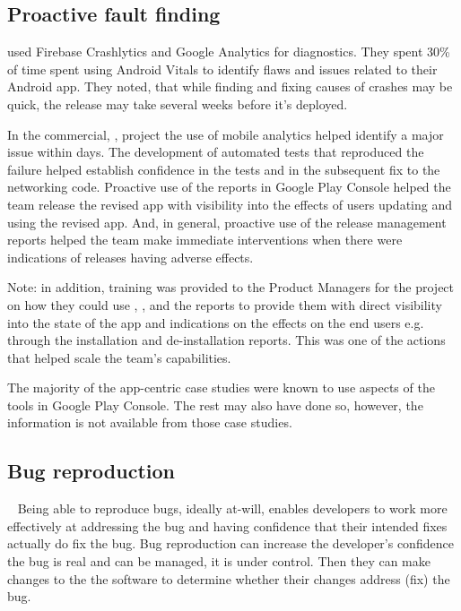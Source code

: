 \subsection{Proactive fault finding}
 used Firebase Crashlytics and Google Analytics for diagnostics. They spent 30\% of time spent using Android Vitals to identify flaws and issues related to their Android app. %
They noted, that while finding and fixing causes of crashes may be quick, the release may take several weeks before it's deployed.

In the commercial, , project the use of mobile analytics helped identify a major issue within days. The development of automated tests that reproduced the failure helped establish confidence in the tests and in the subsequent fix to the networking code. Proactive use of the  reports in Google Play Console helped the team release the revised app with visibility into the effects of users updating and using the revised app. And, in general, proactive use of the release management reports helped the team make immediate interventions when there were indications of releases having adverse effects.

Note: in addition, training was provided to the Product Managers for the project on how they could use , , and the  reports to provide them with direct visibility into the state of the app and indications on the effects on the end users e.g. through the installation and de-installation reports. This was one of the actions that helped scale the team's capabilities.

The majority of the app-centric case studies were known to use aspects of the  tools in Google Play Console. The rest may also have done so, however, the information is not available from those case studies.


\subsection{Bug reproduction}~\label{aiu-bug-reproduction-topic}
Being able to reproduce bugs, ideally at-will, enables developers to work more effectively at addressing the bug and having confidence that their intended fixes actually do fix the bug. 
Bug reproduction can increase the developer's confidence the bug is real and can be managed, it is under control. Then they can make changes to the the software to determine whether their changes address (fix) the bug. 

